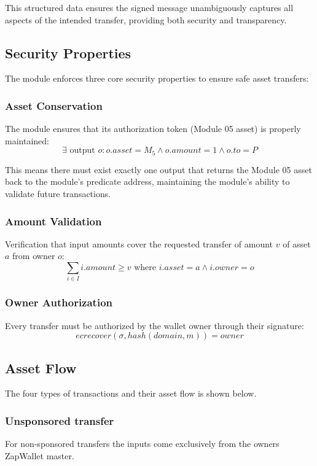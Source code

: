 This structured data ensures the signed message unambiguously captures all aspects of the intended transfer, providing both
security and transparency.



\subsection{Security Properties}
The module enforces three core security properties to ensure safe asset transfers:

\subsubsection{Asset Conservation}
The module ensures that its authorization token (Module 05 asset) is properly maintained:
\[ \exists \text{ output } o : o.asset = M_5 \land o.amount = 1 \land o.to = P \]

This means there must exist exactly one output that returns the Module 05 asset back to the module's predicate address,
maintaining the module's ability to validate future transactions.

\subsubsection{Amount Validation}
Verification that input amounts cover the requested transfer of amount $v$ of asset $a$ from owner $o$:
\[ \sum_{i \in I} i.amount \geq v \text{ where } i.asset = a \land i.owner = o \]


\subsubsection{Owner Authorization}
Every transfer must be authorized by the wallet owner through their signature:
\[ ecrecover(\sigma, hash(domain, m)) = owner \]




%
\subsection{Asset Flow}

The four types of transactions and their asset flow is shown below. \\


\subsubsection{Unsponsored  transfer}
For non-sponsored  transfers the inputs come exclusively from the owners ZapWallet master.\\


